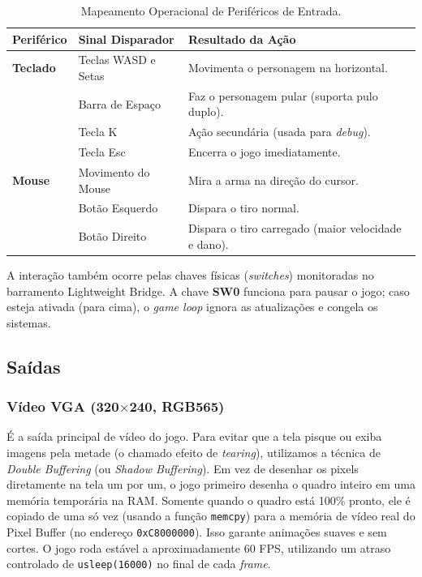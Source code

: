 \documentclass[10pt,twocolumn,letterpaper]{article}
\begin{document}
\begin{table}[H]
\centering
\caption{Mapeamento Operacional de Periféricos de Entrada.}
\label{tab:inputs}
\scriptsize
\begin{tabularx}{\columnwidth}{@{}llX@{}}
\toprule
\textbf{Periférico} & \textbf{Sinal Disparador} & \textbf{Resultado da Ação} \\ \midrule
\textbf{Teclado} & Teclas WASD e Setas & Movimenta o personagem na horizontal. \\
                 & Barra de Espaço & Faz o personagem pular (suporta pulo duplo). \\
                 & Tecla K & Ação secundária (usada para \textit{debug}). \\
                 & Tecla Esc & Encerra o jogo imediatamente. \\ \midrule
\textbf{Mouse} & Movimento do Mouse & Mira a arma na direção do cursor. \\
               & Botão Esquerdo & Dispara o tiro normal. \\
               & Botão Direito & Dispara o tiro carregado (maior velocidade e dano). \\ \bottomrule
\end{tabularx}
\end{table}

A interação também ocorre pelas chaves físicas (\textit{switches}) monitoradas no barramento Lightweight Bridge. A chave \textbf{SW0} funciona para pausar o jogo; caso esteja ativada (para cima), o \textit{game loop} ignora as atualizações e congela os sistemas. 

\subsection{Saídas}

\subsubsection{Vídeo VGA (320$\times$240, RGB565)}
É a saída principal de vídeo do jogo. Para evitar que a tela pisque ou exiba imagens pela metade (o chamado efeito de \textit{tearing}), utilizamos a técnica de \textit{Double Buffering} (ou \textit{Shadow Buffering}). Em vez de desenhar os pixels diretamente na tela um por um, o jogo primeiro desenha o quadro inteiro em uma memória temporária na RAM. Somente quando o quadro está 100\% pronto, ele é copiado de uma só vez (usando a função \texttt{memcpy}) para a memória de vídeo real do Pixel Buffer (no endereço \texttt{0xC8000000}). Isso garante animações suaves e sem cortes. O jogo roda estável a aproximadamente 60 FPS, utilizando um atraso controlado de \texttt{usleep(16000)} no final de cada \textit{frame}.
\end{document}

